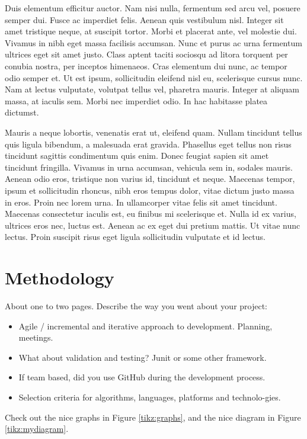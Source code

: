 Duis elementum efficitur auctor. Nam nisi nulla, fermentum sed arcu vel, posuere semper dui. Fusce ac imperdiet felis. Aenean quis vestibulum nisl. Integer sit amet tristique neque, at suscipit tortor. Morbi et placerat ante, vel molestie dui. Vivamus in nibh eget massa facilisis accumsan. Nunc et purus ac urna fermentum ultrices eget sit amet justo. Class aptent taciti sociosqu ad litora torquent per conubia nostra, per inceptos himenaeos. Cras elementum dui nunc, ac tempor odio semper et. Ut est ipsum, sollicitudin eleifend nisl eu, scelerisque cursus nunc. Nam at lectus vulputate, volutpat tellus vel, pharetra mauris. Integer at aliquam massa, at iaculis sem. Morbi nec imperdiet odio. In hac habitasse platea dictumst.

Mauris a neque lobortis, venenatis erat ut, eleifend quam. Nullam tincidunt tellus quis ligula bibendum, a malesuada erat gravida. Phasellus eget tellus non risus tincidunt sagittis condimentum quis enim. Donec feugiat sapien sit amet tincidunt fringilla. Vivamus in urna accumsan, vehicula sem in, sodales mauris. Aenean odio eros, tristique non varius id, tincidunt et neque. Maecenas tempor, ipsum et sollicitudin rhoncus, nibh eros tempus dolor, vitae dictum justo massa in eros. Proin nec lorem urna. In ullamcorper vitae felis sit amet tincidunt. Maecenas consectetur iaculis est, eu finibus mi scelerisque et. Nulla id ex varius, ultrices eros nec, luctus est. Aenean ac ex eget dui pretium mattis. Ut vitae nunc lectus. Proin suscipit risus eget ligula sollicitudin vulputate et id lectus.


\chapter{Methodology}
About one to two pages.
Describe the way you went about your project:
\begin{itemize}
\item Agile / incremental and iterative approach to development. Planning, meetings.
\item What about validation and testing? Junit or some other framework.
\item If team based, did you use GitHub during the development process.
\item Selection criteria for algorithms, languages, platforms and technolo-gies.
\end{itemize}
Check out the nice graphs in Figure \ref{tikz:graphs}, and the nice diagram in Figure \ref{tikz:mydiagram}.

